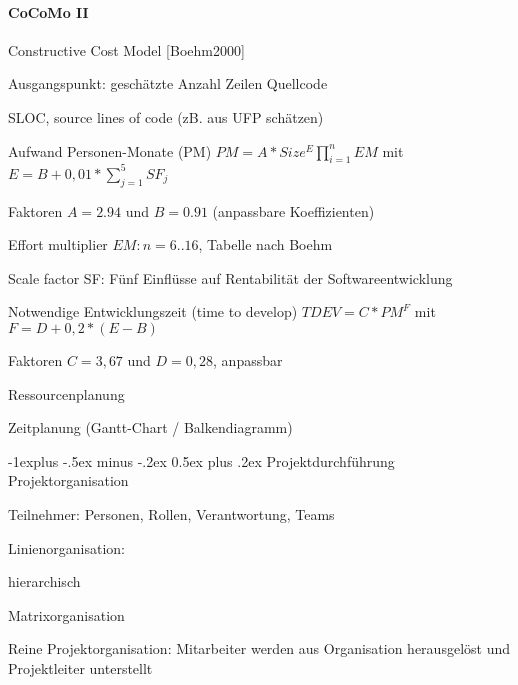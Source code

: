 \documentclass[a4paper]{article}
\makeatletter
\renewcommand{\subsection}{\@startsection{subsection}{2}{0mm}%
                                {-1explus -.5ex minus -.2ex}%
                                {0.5ex plus .2ex}%
                                {\normalfont\normalsize\bfseries}}
\makeatother
\begin{document}
\begin{multicols}{3}
  \paragraph{CoCoMo II}
  \begin{itemize*}
    \item Constructive Cost Model [Boehm2000]
    \item Ausgangspunkt: geschätzte Anzahl Zeilen Quellcode
    \begin{itemize*}
      \item SLOC, source lines of code (zB. aus UFP schätzen)
    \end{itemize*}
    \item Aufwand Personen-Monate (PM) $PM = A * Size^E \prod_{i=1}^n EM$ mit $E=B+0,01*\sum_{j=1}^5 SF_j$
    \item Faktoren $A=2.94$ und $B=0.91$ (anpassbare Koeffizienten)
    \item Effort multiplier $EM: n=6..16$, Tabelle nach Boehm
    \item Scale factor SF: Fünf Einflüsse auf Rentabilität der Softwareentwicklung
    \item Notwendige Entwicklungszeit (time to develop) $TDEV = C * PM^F$ mit $F = D + 0,2 * ( E - B )$
    \item Faktoren $C=3,67$ und $D=0,28$, anpassbar
    \item Ressourcenplanung %
    \item Zeitplanung (Gantt-Chart / Balkendiagramm)
  \end{itemize*}

  \subsection{Projektdurchführung}
  Projektorganisation
  \begin{itemize*}
    \item Teilnehmer: Personen, Rollen, Verantwortung, Teams
    \item Linienorganisation:
    \begin{itemize*}
      \item hierarchisch %
      \item Matrixorganisation %
      \item Reine Projektorganisation: Mitarbeiter werden aus Organisation herausgelöst und Projektleiter unterstellt
    \end{itemize*}
  \end{itemize*}


\end{multicols}
\end{document}

